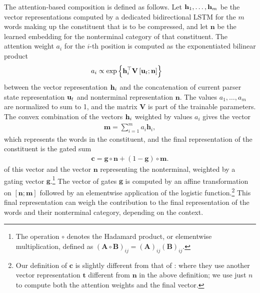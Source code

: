    The attention-based composition is defined as follows. Let $\mathbf{h}_1, \dots, \mathbf{h}_m$ be the vector representations computed by a dedicated bidirectional LSTM for the $m$ words making up the constituent that is to be compressed, and let $\mathbf{n}$ be the learned embedding for the nonterminal category of that constituent. The attention weight $a_i$ for the $i$-th position is computed as the exponentiated bilinear product
    \begin{align*}
      a_i &\propto \exp \Big\{ \mathbf{h}_i^{\top} \mathbf{V} \, [\mathbf{u}_t ; \mathbf{n}] \Big\}
    \end{align*}
    between the vector representation $\mathbf{h}_i$ and the concatenation of current parser state representation $\mathbf{u}_t$ and nonterminal representation $\mathbf{n}$. The values $a_1, \dots, a_m$ are normalized to sum to 1, and the matrix $\mathbf{V}$ is part of the trainable parameters. The convex combination of the vectors $\mathbf{h}_i$ weighted by values $a_i$ gives the vector
    \begin{align*}
      \mathbf{m} = \sum_{i=1}^m a_i \mathbf{h}_i,
    \end{align*}
    which represents the words in the constituent, and the final representation of the constituent is the gated sum
    \begin{align*}
      \mathbf{c} = \mathbf{g} \circ \mathbf{n} + (1 - \mathbf{g}) \circ \mathbf{m}.
    \end{align*}
    of this vector and the vector $\mathbf{n}$ representing the nonterminal, weighted by a gating vector $\mathbf{g}$.\footnote{The operation $\circ$ denotes the Hadamard product, or elementwise multiplication, defined as $(\mathbf{A} \circ \mathbf{B})_{ij} = (\mathbf{A})_{ij}(\mathbf{B})_{ij}$.} The vector of gates $\mathbf{g}$ is computed by an affine transformation on $[ \mathbf{n}; \mathbf{m} ]$ followed by an elementwise application of the logistic function.\footnote{Our definition of $\mathbf{c}$ is slightly different from that of \citet{kuncoro2017syntax}: where they use another vector representation $\mathbf{t}$ different from $\mathbf{n}$ in the above definition; we use just $n$ to compute both the attention weights and the final vector.} This final representation can weigh the contribution to the final representation of the words and their nonterminal category, depending on the context.

